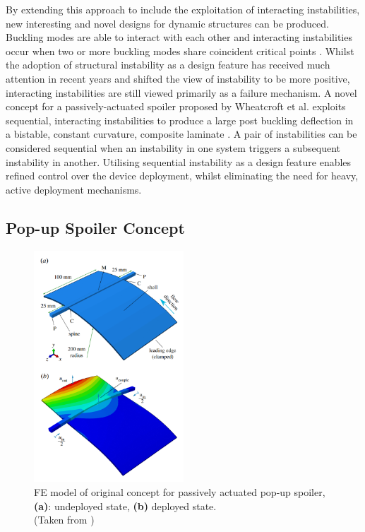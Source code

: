 \documentclass{IEEEtran}
\begin{document}
         By extending this approach to include the exploitation of interacting instabilities, new interesting and novel designs for dynamic structures can be produced. Buckling modes are able to interact with each other and interacting instabilities occur when two or more buckling modes share coincident critical points \cite{Wheatcroft_2023}. Whilst the adoption of structural instability as a design feature has received much attention in recent years and shifted the view of instability to be more positive, interacting instabilities are still viewed primarily as a failure mechanism. A novel concept for a passively-actuated spoiler proposed by Wheatcroft et al. exploits sequential, interacting instabilities to produce a large post buckling deflection in a bistable, constant curvature, composite laminate \cite{Wheatcroft_2023}. A pair of instabilities can be considered sequential when an instability in one system triggers a subsequent instability in another. Utilising sequential instability as a design feature enables refined control over the device deployment, whilst eliminating the need for heavy, active deployment mechanisms.
		
		\subsection{Pop-up Spoiler Concept}
		\begin{figure}[!h]
            \captionsetup{justification=centering}
			\centering{}
			\includegraphics[width=0.5\textwidth]{IntroductionImages/Concept.png}
            \caption{FE model of original concept for passively actuated pop-up spoiler, \textbf{(a)}: undeployed state, \textbf{(b)} deployed state. \\ (Taken from \cite{Wheatcroft_2023})}
			\label{fig:OGConcept}
		\end{figure}
	
\end{document}
